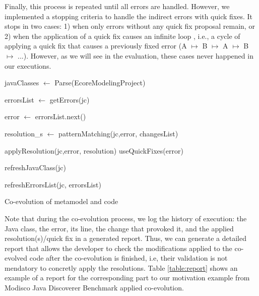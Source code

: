 Finally, this process is repeated until all errors are handled. 
However, we implemented a stopping criteria to handle the indirect errors with quick fixes. 
It stops in two cases: 1) when only errors without any quick fix proposal remain, or 2) when the application of a quick fix causes an infinite loop \cite{cuadrado2018quick,khelladi2019detecting}, i.e., a cycle of applying a quick fix that causes a previously fixed error (A $\mapsto$ B $\mapsto$ A $\mapsto$ B $\mapsto$ ...). However, as we will see in the evaluation, these cases never happened in our executions. 
\begin{algorithm2e}[H]
	\small
	\SetAlgoLined
	javaClasses $\leftarrow$ Parse(EcoreModelingProject)
	
	{
		errorsList $\leftarrow $ getErrors(jc)
		
		{
			error  $\leftarrow$ errorsList.next()
			
			resolution\_s $\leftarrow$ patternMatching(jc,error, changesList)
			
			{
				{
					applyResolution(jc,error, resolution)
				}
			}
			{
				useQuickFixes(error) %
			}
			
			refreshJavaClass(jc) 
			
			refreshErrorsList(jc, errorsList)
		}
		
	}
	\caption{Co-evolution of metamodel and code}
	\label{algo :overallalgo}
\end{algorithm2e}


Note that during the co-evolution process, we log the history of execution: the Java class, the error, its line, the change that provoked it, and the applied resolution(s)/quick fix in a generated report. Thus, we can generate a detailed report that allows the developer to check the modifications applied to the co-evolved code after the co-evolution is finished, i.e, their validation is not mendatory to concretly apply the resolutions.
Table \ref{table:report} shows an example of a report for the corresponding part to our motivation example from Modisco Java Discoverer Benchmark applied co-evolution. %

